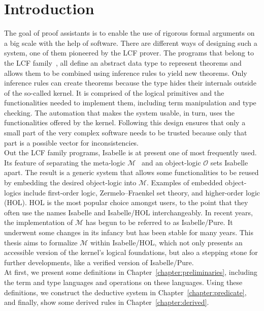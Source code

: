 
\chapter{Introduction}\label{chapter:introduction}

The goal of proof assistants is to enable the use of rigorous formal arguments on a big scale with the help of software.
There are different ways of designing such a system, one of them pioneered by the LCF prover.
The programs that belong to the LCF family~\parencite{Gordon2000}, all define an abstract data type to represent theorems and allows them to be combined using inference rules to yield new theorems.
Only inference rules can create theorems because the type hides their internals outside of the so-called kernel.
It is comprised of the logical primitives and the functionalities needed to implement them, including term manipulation and type checking.
The automation that makes the system usable, in turn, uses the functionalities offered by the kernel.
Following this design ensures that only a small part of the very complex software needs to be trusted because only that part is a possible vector for inconsistencies.\\

Out the LCF family programs, Isabelle is at present one of most frequently used.
Its feature of separating the meta-logic \(\mathcal{M}\)~\parencite{Paulson1988} and an object-logic \(\mathcal{O}\) sets Isabelle apart.
The result is a generic system that allows some functionalities to be reused by embedding the desired object-logic into \(\mathcal{M}\).
Examples of embedded object-logics include first-order logic, Zermelo–Fraenkel set theory, and higher-order logic (HOL).
HOL is the most popular choice amongst users, to the point that they often use the names Isabelle and Isabelle/HOL interchangeably.
In recent years, the implementation of \(\mathcal{M}\) has begun to be referred to as Isabelle/Pure.
It underwent some changes in its infancy but has been stable for many years.
This thesis aims to formalize \(\mathcal{M}\) within Isabelle/HOL, which not only presents an accessible version of the kernel's logical foundations, but also a stepping stone for further developments, like a verified version of Isabelle/Pure.\\

At first, we present some definitions in Chapter~\ref{chapter:preliminaries}, including the term and type languages and operations on these languages.
Using these definitions, we construct the deductive system in Chapter~\ref{chapter:predicate}, and finally, show some derived rules in Chapter~\ref{chapter:derived}.